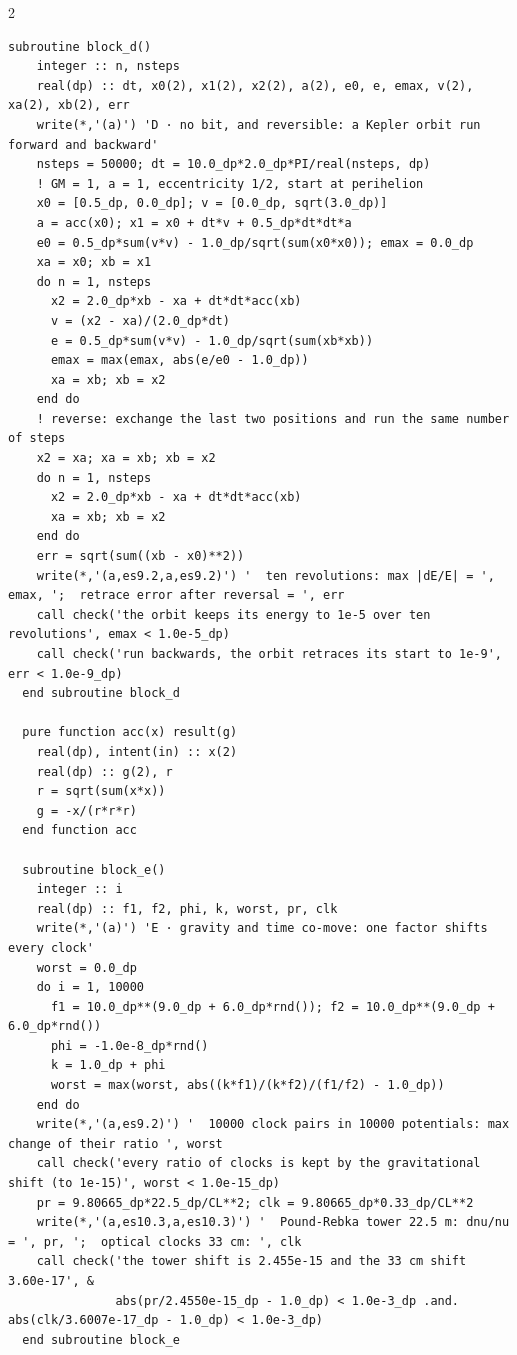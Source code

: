 \documentclass[10pt]{article}
\begin{document}
\begin{multicols}{2}
\begin{Verbatim}[fontsize=\fontsize{5.9}{6.8}\selectfont,breaklines,breakanywhere,breaksymbolleft={}]
  subroutine block_d()
    integer :: n, nsteps
    real(dp) :: dt, x0(2), x1(2), x2(2), a(2), e0, e, emax, v(2), xa(2), xb(2), err
    write(*,'(a)') 'D · no bit, and reversible: a Kepler orbit run forward and backward'
    nsteps = 50000; dt = 10.0_dp*2.0_dp*PI/real(nsteps, dp)
    ! GM = 1, a = 1, eccentricity 1/2, start at perihelion
    x0 = [0.5_dp, 0.0_dp]; v = [0.0_dp, sqrt(3.0_dp)]
    a = acc(x0); x1 = x0 + dt*v + 0.5_dp*dt*dt*a
    e0 = 0.5_dp*sum(v*v) - 1.0_dp/sqrt(sum(x0*x0)); emax = 0.0_dp
    xa = x0; xb = x1
    do n = 1, nsteps
      x2 = 2.0_dp*xb - xa + dt*dt*acc(xb)
      v = (x2 - xa)/(2.0_dp*dt)
      e = 0.5_dp*sum(v*v) - 1.0_dp/sqrt(sum(xb*xb))
      emax = max(emax, abs(e/e0 - 1.0_dp))
      xa = xb; xb = x2
    end do
    ! reverse: exchange the last two positions and run the same number of steps
    x2 = xa; xa = xb; xb = x2
    do n = 1, nsteps
      x2 = 2.0_dp*xb - xa + dt*dt*acc(xb)
      xa = xb; xb = x2
    end do
    err = sqrt(sum((xb - x0)**2))
    write(*,'(a,es9.2,a,es9.2)') '  ten revolutions: max |dE/E| = ', emax, ';  retrace error after reversal = ', err
    call check('the orbit keeps its energy to 1e-5 over ten revolutions', emax < 1.0e-5_dp)
    call check('run backwards, the orbit retraces its start to 1e-9', err < 1.0e-9_dp)
  end subroutine block_d

  pure function acc(x) result(g)
    real(dp), intent(in) :: x(2)
    real(dp) :: g(2), r
    r = sqrt(sum(x*x))
    g = -x/(r*r*r)
  end function acc

  subroutine block_e()
    integer :: i
    real(dp) :: f1, f2, phi, k, worst, pr, clk
    write(*,'(a)') 'E · gravity and time co-move: one factor shifts every clock'
    worst = 0.0_dp
    do i = 1, 10000
      f1 = 10.0_dp**(9.0_dp + 6.0_dp*rnd()); f2 = 10.0_dp**(9.0_dp + 6.0_dp*rnd())
      phi = -1.0e-8_dp*rnd()
      k = 1.0_dp + phi
      worst = max(worst, abs((k*f1)/(k*f2)/(f1/f2) - 1.0_dp))
    end do
    write(*,'(a,es9.2)') '  10000 clock pairs in 10000 potentials: max change of their ratio ', worst
    call check('every ratio of clocks is kept by the gravitational shift (to 1e-15)', worst < 1.0e-15_dp)
    pr = 9.80665_dp*22.5_dp/CL**2; clk = 9.80665_dp*0.33_dp/CL**2
    write(*,'(a,es10.3,a,es10.3)') '  Pound-Rebka tower 22.5 m: dnu/nu = ', pr, ';  optical clocks 33 cm: ', clk
    call check('the tower shift is 2.455e-15 and the 33 cm shift 3.60e-17', &
               abs(pr/2.4550e-15_dp - 1.0_dp) < 1.0e-3_dp .and. abs(clk/3.6007e-17_dp - 1.0_dp) < 1.0e-3_dp)
  end subroutine block_e


\end{Verbatim}
\end{multicols}
\end{document}
